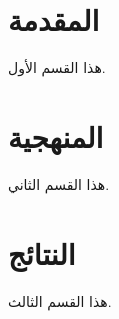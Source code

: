 ﻿\documentclass{article}
\begin{document}
\tableofcontents
\section{المقدمة}
هذا القسم الأول.
\section{المنهجية}
هذا القسم الثاني.
\section{النتائج}
هذا القسم الثالث.
\end{document}
